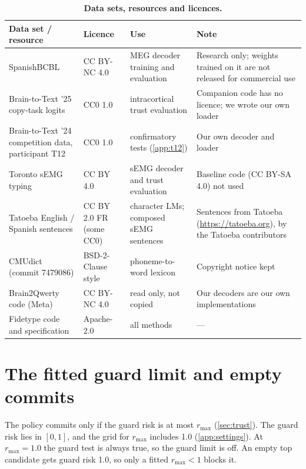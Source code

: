\begin{table}[H]
  \centering
  \caption{\textbf{Data sets, resources and licences.}}
  \label{tab:licences}
  \small
  \begin{tabular}{@{}p{4.3cm}p{2.4cm}p{3.6cm}p{4.2cm}@{}}
    \toprule
    \textbf{Data set / resource} & \textbf{Licence} & \textbf{Use} & \textbf{Note} \\
    \midrule
    SpanishBCBL \citep{levy2026brain2qwerty,spanishbcbl} & CC BY-NC 4.0 & MEG decoder training and evaluation & Research only; weights trained on it are not released for commercial use \\
    Brain-to-Text '25 copy-task logits \citep{card2024accurate,card2025data} & CC0 1.0 & intracortical trust evaluation & Companion code has no licence; we wrote our own loader \\
    Brain-to-Text '24 competition data, participant T12 \citep{willett2023speech} & CC0 1.0 & confirmatory tests (\cref{app:t12}) & Our own decoder and loader \\
    Toronto sEMG typing \citep{achituve2025emg,achituve2024data} & CC BY 4.0 & sEMG decoder and trust evaluation & Baseline code (CC BY-SA 4.0) not used \\
    Tatoeba English / Spanish sentences & CC BY 2.0 FR (some CC0) & character LMs; composed sEMG sentences & Sentences from Tatoeba (\url{https://tatoeba.org}), by the Tatoeba contributors \\
    CMUdict (commit 7479086) & BSD-2-Clause style & phoneme-to-word lexicon & Copyright notice kept \\
    Brain2Qwerty code (Meta) & CC BY-NC 4.0 & read only, not copied & Our decoders are our own implementations \\
    Fidetype code and specification & Apache-2.0 & all methods & --- \\
    \bottomrule
  \end{tabular}
\end{table}

\section{The fitted guard limit and empty commits}
\label{app:guardlimit}

The policy commits only if the guard risk is at most $r_{\max}$ (\cref{sec:trust}). The guard risk lies in $[0,1]$, and the grid for $r_{\max}$ includes 1.0 (\cref{app:settings}). At $r_{\max} = 1.0$ the guard test is always true, so the guard limit is off. An empty top candidate gets guard risk 1.0, so only a fitted $r_{\max} < 1$ blocks it.

